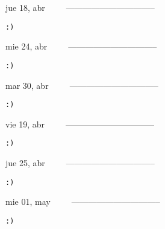 \documentclass[letterpaper,10pt]{article}
\begin{document}
\begin{multicols}{3}
{jue 18, abr\ \ \ \ \ --------------------------------}
\begin{flushright}\begin{small}\texttt{:)}\end{small}\end{flushright}
\vfill
{mie 24, abr\ \ \ \ \ --------------------------------}
\begin{flushright}\begin{small}\texttt{:)}\end{small}\end{flushright}\par
\vfill
{mar 30, abr\ \ \ \ \ --------------------------------}
\begin{flushright}\begin{small}\texttt{:)}\end{small}\end{flushright}\par
\vfill
\end{multicols}
\vspace{1.05cm}

\begin{multicols}{3}
{vie 19, abr\ \ \ \ \ --------------------------------}
\begin{flushright}\begin{small}\texttt{:)}\end{small}\end{flushright}
\vfill
{jue 25, abr\ \ \ \ \ --------------------------------}
\begin{flushright}\begin{small}\texttt{:)}\end{small}\end{flushright}\par
\vfill
{mie 01, may\ \ \ \ \ --------------------------------}
\begin{flushright}\begin{small}\texttt{:)}\end{small}\end{flushright}\par
\vfill
\end{multicols}
\vspace{1.05cm}
\end{document}
